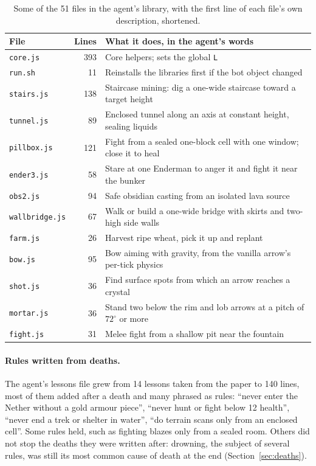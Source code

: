 \documentclass[11pt,a4paper]{article}
\begin{document}
\begin{table}[t]
  \caption{Some of the 51 files in the agent's library, with the first line of each file's own description, shortened.}
  \label{tab:lib}
  \small
  \begin{tabularx}{\textwidth}{@{}lrX@{}}
    \toprule
    \textbf{File} & \textbf{Lines} & \textbf{What it does, in the agent's words} \\
    \midrule
    \texttt{core.js} & 393 & Core helpers; sets the global \texttt{L} \\
    \texttt{run.sh} & 11 & Reinstalls the libraries first if the bot object changed \\
    \texttt{stairs.js} & 138 & Staircase mining: dig a one-wide staircase toward a target height \\
    \texttt{tunnel.js} & 89 & Enclosed tunnel along an axis at constant height, sealing liquids \\
    \texttt{pillbox.js} & 121 & Fight from a sealed one-block cell with one window; close it to heal \\
    \texttt{ender3.js} & 58 & Stare at one Enderman to anger it and fight it near the bunker \\
    \texttt{obs2.js} & 94 & Safe obsidian casting from an isolated lava source \\
    \texttt{wallbridge.js} & 67 & Walk or build a one-wide bridge with skirts and two-high side walls \\
    \texttt{farm.js} & 26 & Harvest ripe wheat, pick it up and replant \\
    \texttt{bow.js} & 95 & Bow aiming with gravity, from the vanilla arrow's per-tick physics \\
    \texttt{shot.js} & 36 & Find surface spots from which an arrow reaches a crystal \\
    \texttt{mortar.js} & 36 & Stand two below the rim and lob arrows at a pitch of $72^{\circ}$ or more \\
    \texttt{fight.js} & 31 & Melee fight from a shallow pit near the fountain \\
    \bottomrule
  \end{tabularx}
\end{table}

\paragraph{Rules written from deaths.} The agent's lessons file grew from 14 lessons taken from the paper to 140 lines, most of them added after a death and many phrased as rules: ``never enter the Nether without a gold armour piece'', ``never hunt or fight below 12 health'', ``never end a trek or shelter in water'', ``do terrain scans only from an enclosed cell''. Some rules held, such as fighting blazes only from a sealed room. Others did not stop the deaths they were written after: drowning, the subject of several rules, was still its most common cause of death at the end (Section~\ref{sec:deaths}).
\end{document}
